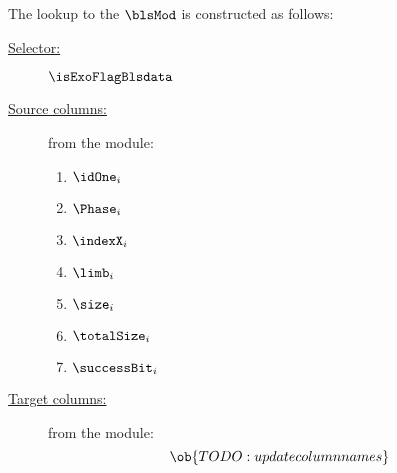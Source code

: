 The lookup to the $\blsMod$ is constructed as follows:
\begin{description}
	\item[\underline{Selector:}] $\isExoFlagBlsdata$
	\item[\underline{Source columns:}] from the \mmioMod{} module:
		\begin{multicols}{3}
			\begin{enumerate}
				\item $\idOne_{i}$
				\item $\Phase_{i}$
				\item $\indexX_{i}$
				\item $\limb_{i}$
				\item $\size_{i}$
				\item $\totalSize_{i}$
				\item $\successBit_{i}$
			\end{enumerate}
		\end{multicols}
	\item[\underline{Target columns:}] from the \ecDataMod{} module: 
		\[
			\ob{TODO: update column names}
		\]
\end{description}